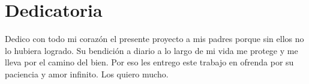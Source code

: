 \chapter{Dedicatoria}

Dedico con todo mi corazón el presente proyecto a mis padres porque sin ellos no lo hubiera logrado. Su bendición a diario a lo largo de mi vida me protege y me lleva por el camino del bien. Por eso les entrego este trabajo en ofrenda por su paciencia y amor infinito. Los quiero mucho.